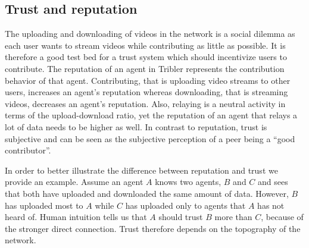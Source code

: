 \subsection{Trust and reputation}
The uploading and downloading of videos in the network is a social dilemma as each user wants to 
stream videos while contributing as little as possible. It is therefore a good test bed for a trust 
system which should incentivize users to contribute. The reputation of an agent in Tribler represents the 
contribution behavior of that agent. Contributing, that is uploading video streams to other users,
increases an agent's reputation whereas downloading, that is streaming videos, decreases an agent's 
reputation. Also, relaying is a neutral activity in terms of the upload-download ratio, yet the 
reputation of an agent that relays a lot of data needs to be higher as well. In contrast to 
reputation, trust is subjective and can be seen as the subjective perception of a peer being a 
``good contributor''. 

In order to better illustrate the difference between reputation and trust we provide an example.
Assume an agent $A$ knows two agents, $B$ and $C$ and sees that both have uploaded and downloaded 
the same amount of data. However, $B$ has uploaded most to $A$ while $C$ has uploaded only to 
agents that $A$ has not heard of. Human intuition tells us that $A$ should trust $B$ more than $C$, 
because of the stronger direct connection. Trust therefore depends on the topography of the network.




